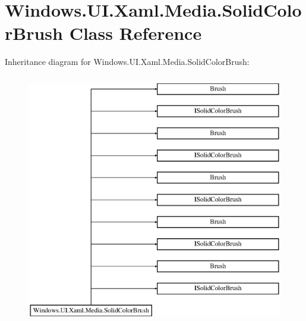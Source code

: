 \hypertarget{class_windows_1_1_u_i_1_1_xaml_1_1_media_1_1_solid_color_brush}{}\section{Windows.\+U\+I.\+Xaml.\+Media.\+Solid\+Color\+Brush Class Reference}
\label{class_windows_1_1_u_i_1_1_xaml_1_1_media_1_1_solid_color_brush}
Inheritance diagram for Windows.\+U\+I.\+Xaml.\+Media.\+Solid\+Color\+Brush\+:\begin{figure}[H]
\begin{center}
\leavevmode
\includegraphics[height=11.000000cm]{class_windows_1_1_u_i_1_1_xaml_1_1_media_1_1_solid_color_brush}
\end{center}
\end{figure}
